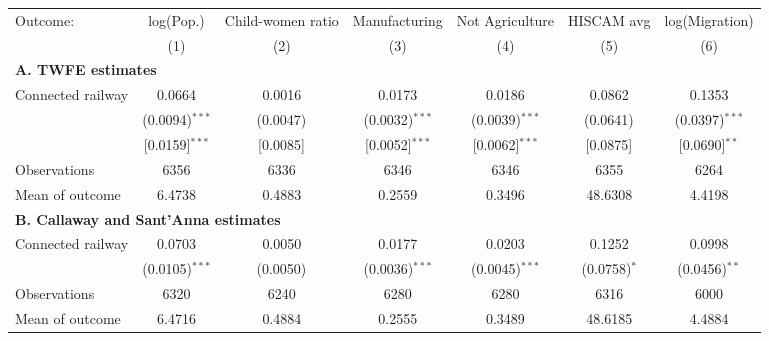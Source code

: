 \begin{tabular}{lcccccc}
  \toprule
  Outcome: & log(Pop.) & Child-women ratio & Manufacturing & Not Agriculture & HISCAM avg & log(Migration) \\
           & (1) & (2) & (3) & (4) & (5) & (6) \\
  \midrule
  \multicolumn{7}{l}{\textbf{A. TWFE estimates}}\\
  Connected railway &  0.0664 & 0.0016 & 0.0173 & 0.0186 & 0.0862 & 0.1353  \\
                    &  (0.0094)$^{***}$ & (0.0047)$^{}$ & (0.0032)$^{***}$ & (0.0039)$^{***}$ & (0.0641)$^{}$ & (0.0397)$^{***}$  \\
                    &  [0.0159]$^{***}$ & [0.0085]$^{}$ & [0.0052]$^{***}$ & [0.0062]$^{***}$ & [0.0875]$^{}$ & [0.0690]$^{**}$  \\
  \cmidrule(lr){2-7}
  Observations      &  6356 & 6336 & 6346 & 6346 & 6355 & 6264  \\
  Mean of outcome   &  6.4738 & 0.4883 & 0.2559 & 0.3496 & 48.6308 & 4.4198  \\
  \midrule
  \multicolumn{7}{l}{\textbf{B. Callaway and Sant'Anna estimates}}\\
  Connected railway &  0.0703 & 0.0050 & 0.0177 & 0.0203 & 0.1252 & 0.0998  \\
                    &  (0.0105)$^{***}$ & (0.0050)$^{}$ & (0.0036)$^{***}$ & (0.0045)$^{***}$ & (0.0758)$^{*}$ & (0.0456)$^{**}$  \\
  \cmidrule(lr){2-7}
  Observations      &  6320 & 6240 & 6280 & 6280 & 6316 & 6000  \\
  Mean of outcome   &  6.4716 & 0.4884 & 0.2555 & 0.3489 & 48.6185 & 4.4884  \\
  \bottomrule
\end{tabular}
